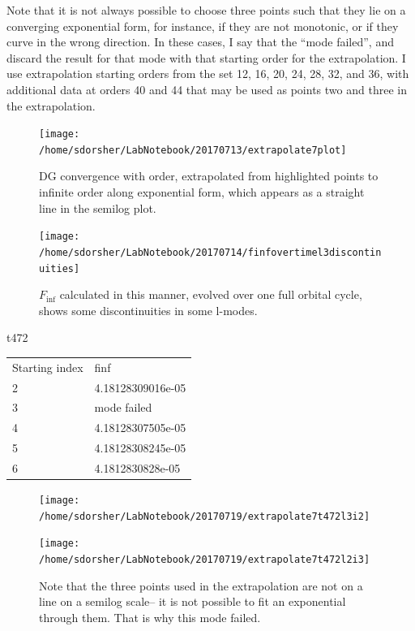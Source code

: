 Note that it is not always possible to choose three points such that they lie on a converging exponential form, for instance, if they are not monotonic, or if they curve in the wrong direction. In these cases, I say that the ``mode failed'', and discard the result for that mode with that starting order for the extrapolation. I use extrapolation starting orders from the set 12, 16, 20, 24, 28, 32, and 36, with additional data at orders 40 and 44 that may be used as points two and three in the extrapolation. 

\begin{figure}
\texttt{[image: /home/sdorsher/LabNotebook/20170713/extrapolate7plot]}
\caption{DG convergence with order, extrapolated from highlighted points to infinite order along exponential form, which appears as a straight line in the semilog plot.}
\end{figure}



\begin{figure}
  \texttt{[image: /home/sdorsher/LabNotebook/20170714/finfovertimel3discontinuities]}
  \caption{$F_{\inf}$ calculated in this manner, evolved over one full orbital cycle, shows some discontinuities in some l-modes.}
\end{figure}




t472
\begin{table}
\begin{tabular}{ll}
Starting index & finf\\
2 & 4.18128309016e-05\\
3 & mode failed\\
4 & 4.18128307505e-05\\
5 & 4.18128308245e-05\\
6 & 4.1812830828e-05\\
\end{tabular}
\end{table}


\begin{figure}
  \texttt{[image: /home/sdorsher/LabNotebook/20170719/extrapolate7t472l3i2]}
\end{figure}

\begin{figure}
  \texttt{[image: /home/sdorsher/LabNotebook/20170719/extrapolate7t472l2i3]}
  \caption{Note that the three points used in the extrapolation are not on a line on a semilog scale-- it is not possible to fit an exponential through them. That is why this mode failed.}
\end{figure}

